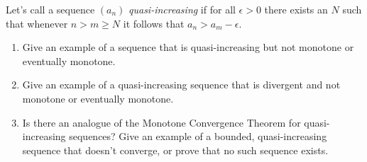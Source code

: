 \documentclass{lew98_solutions}
\begin{document}
\begin{exercise}
\label{ex:2.6.6}
    Let's call a sequence \( (a_n) \) \textit{quasi-increasing} if for all \( \epsilon > 0 \) there exists an \( N \) such that whenever \( n > m \geq N \) it follows that \( a_n > a_m - \epsilon \).
    \begin{enumerate}
        \item Give an example of a sequence that is quasi-increasing but not monotone or eventually monotone.

        \item Give an example of a quasi-increasing sequence that is divergent and not monotone or eventually monotone.

        \item Is there an analogue of the Monotone Convergence Theorem for quasi-increasing sequences? Give an example of a bounded, quasi-increasing sequence that doesn't converge, or prove that no such sequence exists.
    \end{enumerate}
\end{exercise}
\end{document}
